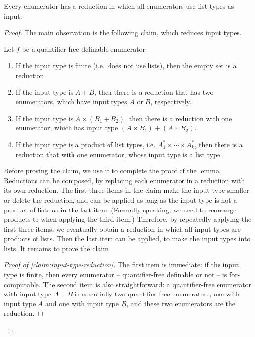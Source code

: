 \begin{lemma}\label{lem:reduction-lemma}
        Every  enumerator has a reduction in which all  enumerators use  list types as input.
    \end{lemma}
\begin{proof}
    The main observation is the following claim, which reduces input types.


            \begin{claim}\label{claim:input-type-reduction}
            Let $f$ be a  quantifier-free definable enumerator.
                        \begin{enumerate}
    \item If the input type is finite (i.e.~does not use lists), then the empty set is a reduction.
    \item If the input type is $A+B$, then there is a reduction that has two enumerators, which have input types $A$ or $B$, respectively.
    \item If the input type is $A \times (B_1+B_2)$, then there is a reduction with  one  enumerator, which  has input type $(A \times B_1) + (A \times B_2)$.
    \item If the input type is a product of list types, i.e. $A_1^* \times \cdots \times A_k^*$, then there is a reduction that with one enumerator, whose   input type is a list type.
\end{enumerate}
        \end{claim}




        Before proving the claim, we use it to complete the proof of the lemma.         
        Reductions can be composed, by replacing each enumerator in a reduction with its own reduction.  The first three items in the claim make the input type smaller or delete the reduction, and can be applied as long as the input type is not a product of lists as in the last item. (Formally speaking, we need to rearrange products to when applying the third item.) Therefore, by repeatedly applying the first three items, we eventually obtain a reduction in which all input types are  products of lists.  Then the last item can be applied, to make the input types into lists. It remains to prove the claim.

        \begin{proof}[Proof of \cref{claim:input-type-reduction}]
        The first item is immediate: if the input type  is finite, then every enumerator -- quantifier-free definable or not --  is for-computable.  The second item is also straightforward:  a quantifier-free enumerator with input type $A+B$ is essentially two quantifier-free enumerators,   one with input type $A$ and one with input type $B$, and these two enumerators are the reduction.


\end{proof}
\end{proof}
